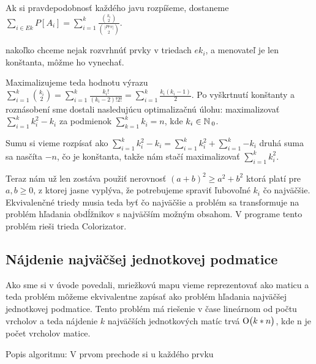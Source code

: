 Ak si pravdepodobnosť každého javu rozpíšeme, dostaneme 
$\sum_{i \in Ek}P[A_i] = \sum_{i = 1}^{k} \frac{{{k_i} \choose {2}}}{{{|Prv|} \choose {2}}}$.


nakoľko chceme nejak rozvrhnúť prvky v triedach $ek_i$, a menovateľ je len
konštanta, môžme ho vynechať.

Maximalizujeme teda hodnotu výrazu 
$\sum_{i = 1}^{k} {{k_i} \choose {2}} = \sum_{i = 1}^{k} {\frac{k_i!}{(k_i -2 )!2!}} = \sum_{i = 1}^{k}{\frac{k_i (k_i-1)}{2}}$.
Po vyškrtnutí konštanty a roznásobení sme dostali nasledujúcu optimalizačnú úlohu:
maximalizovať $\sum_{i = 1}^{k} {k_i^2 - k_i}$ za podmienok $\sum_{k=1}^{k}k_i = n$,
kde $k_i \in \mathbb{N}\,_0$.

Sumu si vieme rozpísať ako 
$\sum_{i = 1}^{k} {k_i^2 - k_i} = \sum_{i = 1}^{k} {k_i^2} + \sum_{i = 1}^{k}{-k_i}$
druhá suma sa nasčíta $-n$, čo je konštanta, takže nám stačí maximalizovať 
$\sum_{i = 1}^{k} {k_i^2}$.

Teraz nám už len zostáva použiť nerovnosť
$(a+b)^2 \geq a^2 + b^2$ ktorá platí pre $a,b \geq 0$, z ktorej jasne vyplýva, že potrebujeme spraviť ľubovoľné $k_i$ čo najväčšie.
Ekvivalenčné triedy musia teda byť čo najväčšie a problém sa transformuje na problém hľadania
obdĺžnikov s najväčším možným obsahom.
V programe tento problém rieši trieda Colorizator.


\subsection{Nájdenie najväčšej jednotkovej podmatice}
Ako sme si v úvode povedali, mriežkovú mapu vieme reprezentovať ako maticu a teda
problém môžeme ekvivalentne zapísať ako problém hľadania najväčšej jednotkovej podmatice.
Tento problém má riešenie v čase lineárnom od počtu vrcholov a teda nájdenie $k$ najväčších
jednotkových matíc trvá $\operatorname{O}\bigl(k*n\bigr)$, kde n je počet vrcholov matice.

Popis algoritmu: 
V prvom prechode si u každého prvku 
